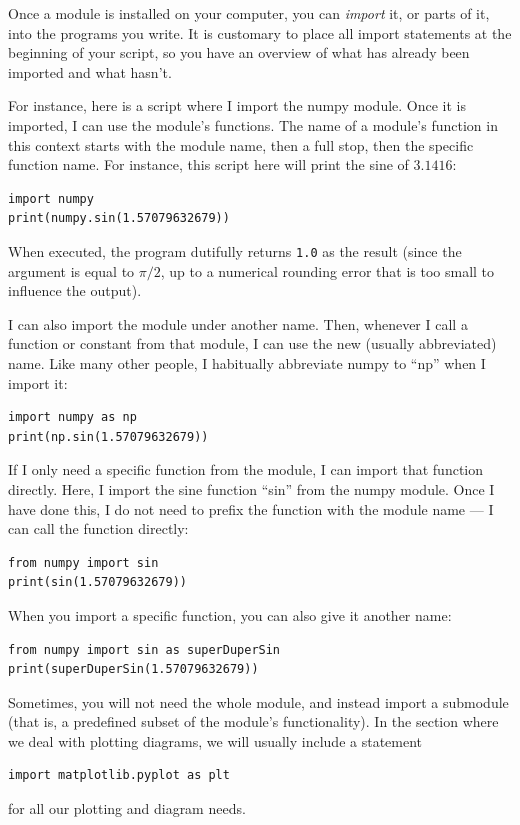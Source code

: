 \documentclass[twocolumn,apj]{openjournal}
\begin{document}
Once a module is installed on your computer, you can {\em import} it, or parts of it, into the programs you write. It is customary to place all import statements at the beginning of your script, so you have an overview of what has already been imported and what hasn't.

For instance, here is a script where I import the numpy module. Once it is imported, I can use the module's functions. The name of a module's function in this context starts with the module name, then a full stop, then the specific function name. For instance, this script here will print the sine of $3.1416$:
\begin{lstlisting}
import numpy
print(numpy.sin(1.57079632679))
\end{lstlisting}
When executed, the program dutifully returns \verb|1.0| as the result (since the argument is equal to $\pi/2$, up to a numerical rounding error that is too small to influence the output).

I can also import the module under another name. Then, whenever I call a function or constant from that module, I can use the new (usually abbreviated) name. Like many other people, I habitually abbreviate numpy to ``np'' when I import it:
\begin{lstlisting}
import numpy as np
print(np.sin(1.57079632679))
\end{lstlisting}

If I only need a specific function from the module, I can import that function directly. Here, I import the sine function ``sin'' from the numpy module. Once I have done this, I do not need to prefix the function with the module name --- I can call the function directly:
\begin{lstlisting}
from numpy import sin
print(sin(1.57079632679))
\end{lstlisting}
When you import a specific function, you can also give it another name:
\begin{lstlisting}
from numpy import sin as superDuperSin
print(superDuperSin(1.57079632679))
\end{lstlisting}

Sometimes, you will not need the whole module, and instead import a submodule (that is, a predefined subset of the module's functionality). In the section where we deal with plotting diagrams, we will usually include a statement
\begin{lstlisting}
import matplotlib.pyplot as plt
\end{lstlisting}
for all our plotting and diagram needs.
\end{document}
